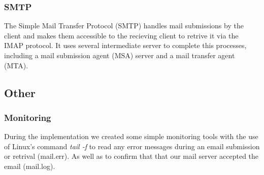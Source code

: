 \subsubsection{SMTP}
The Simple Mail Transfer Protocol (SMTP) handles mail submissions by the
client and makes them accessible to the recieving client to retrive it
via the IMAP protocol. It uses several intermediate server to complete
this processes, including a mail submission agent (MSA) server and a
mail transfer agent (MTA).
\subsection{Other}
\subsubsection{Monitoring}
During the implementation we created some simple monitoring tools with
the use of Linux's command \emph{tail -f} to read any error messages 
during an email submission or retrival (mail.err). As well as to confirm 
that that our mail server accepted the email (mail.log).\\


